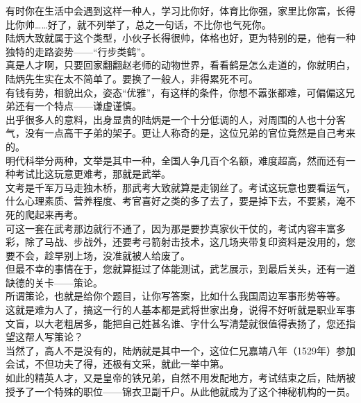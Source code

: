 \begin{multicols}{\theparacolNo}
有时你在生活中会遇到这样一种人，学习比你好，体育比你强，家里比你富，长得比你帅……好了，就不列举了，总之一句话，不比你也气死你。\\

陆炳大致就属于这个类型，小伙子长得很帅，体格也好，更为特别的是，他有一种独特的走路姿势——“行步类鹤”。\\

真是人才啊，只要回家翻翻赵老师的动物世界，看看鹤是怎么走道的，你就明白，陆炳先生实在太不简单了。要换了一般人，非得累死不可。\\

有钱有势，相貌出众，姿态“优雅”，有这样的条件，你想不嚣张都难，可偏偏这兄弟还有一个特点——谦虚谨慎。\\

出乎很多人的意料，出身显贵的陆炳是一个十分低调的人，对周围的人也十分客气，没有一点高干子弟的架子。更让人称奇的是，这位兄弟的官位竟然是自己考来的。\\

明代科举分两种，文举是其中一种，全国人争几百个名额，难度超高，然而还有一种考试比这玩意更难考，那就是武举。\\

文考是千军万马走独木桥，那武考大致就算是走钢丝了。考试这玩意也要看运气，什么心理素质、营养程度、考官喜好之类的多了去了，要是掉下去，不要紧，淹不死的爬起来再考。\\

可这一套在武考那边就行不通了，因为那是要抄真家伙干仗的，考试内容丰富多彩，除了马战、步战外，还要考弓箭射击技术，这几场夹带复印资料是没用的，您要不会，趁早别上场，没准就被人给废了。\\

但最不幸的事情在于，您就算挺过了体能测试，武艺展示，到最后关头，还有一道缺德的关卡——策论。\\

所谓策论，也就是给你个题目，让你写答案，比如什么我国周边军事形势等等。\\

这就是难为人了，搞这一行的人基本都是武将世家出身，说得不好听就是职业军事文盲，以大老粗居多，能把自己姓甚名谁、字什么写清楚就很值得表扬了，您还指望这帮人写策论？\\

当然了，高人不是没有的，陆炳就是其中一个，这位仁兄嘉靖八年（1529年）参加会试，不但功夫了得，还极有文采，就此一举中第。\\

如此的精英人才，又是皇帝的铁兄弟，自然不用发配地方，考试结束之后，陆炳被授予了一个特殊的职位——锦衣卫副千户。从此他就成为了这个神秘机构的一员。\\


\end{multicols}

